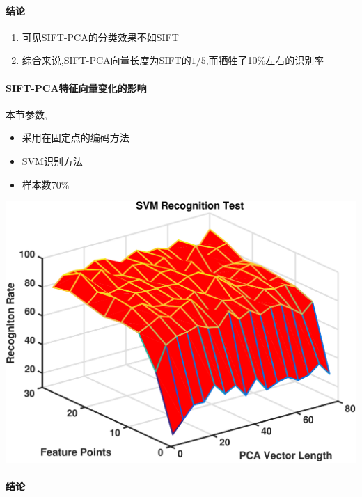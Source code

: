 \paragraph{结论}
\begin{enumerate}
	\item 可见SIFT-PCA的分类效果不如SIFT
	\item 综合来说,SIFT-PCA向量长度为SIFT的$1/5$,而牺牲了10\%左右的识别率
\end{enumerate}

\paragraph{SIFT-PCA特征向量变化的影响}
本节参数,
\begin{itemize}
	\item 采用在固定点的编码方法
	\item SVM识别方法
	\item 样本数70\%
\end{itemize}

		\begin{center}
		\begin{minipage}[t]{\linewidth}
		\center
		{
		\includegraphics[width=\textwidth]{Img/c3/sift_pca_iter} 
		}
		\end{minipage}
		\medskip
		\end{center}

\paragraph{结论}

